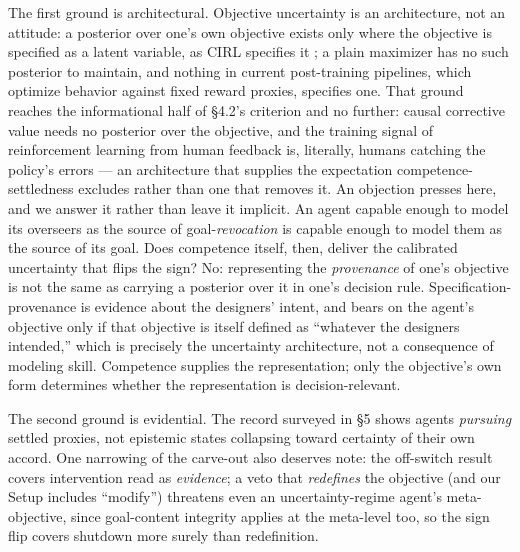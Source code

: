 \documentclass[11pt]{article}
\theoremstyle{definition}
\begin{document}
The first ground is architectural. Objective uncertainty is an architecture, not an attitude: a posterior over one's own objective exists only where the objective is specified as a latent variable, as CIRL specifies it \cite{hadfieldmenell2016cirl}; a plain maximizer has no such posterior to maintain, and nothing in current post-training pipelines, which optimize behavior against fixed reward proxies, specifies one. That ground reaches the informational half of \S4.2's criterion and no further: causal corrective value needs no posterior over the objective, and the training signal of reinforcement learning from human feedback is, literally, humans catching the policy's errors --- an architecture that supplies the expectation competence-settledness excludes rather than one that removes it. An objection presses here, and we answer it rather than leave it implicit. An agent capable enough to model its overseers as the source of goal-\emph{revocation} is capable enough to model them as the source of its goal. Does competence itself, then, deliver the calibrated uncertainty that flips the sign? No: representing the \emph{provenance} of one's objective is not the same as carrying a posterior over it in one's decision rule. Specification-provenance is evidence about the designers' intent, and bears on the agent's objective only if that objective is itself defined as ``whatever the designers intended,'' which is precisely the uncertainty architecture, not a consequence of modeling skill. Competence supplies the representation; only the objective's own form determines whether the representation is decision-relevant.

The second ground is evidential. The record surveyed in \S5 shows agents \emph{pursuing} settled proxies, not epistemic states collapsing toward certainty of their own accord. One narrowing of the carve-out also deserves note: the off-switch result covers intervention read as \emph{evidence}; a veto that \emph{redefines} the objective (and our Setup includes ``modify'') threatens even an uncertainty-regime agent's meta-objective, since goal-content integrity applies at the meta-level too, so the sign flip covers shutdown more surely than redefinition.
\end{document}
